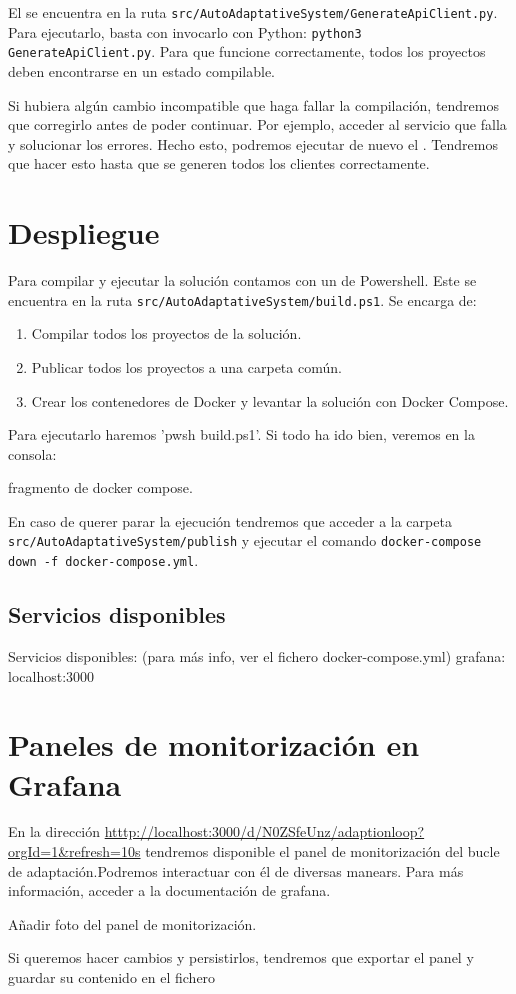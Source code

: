 El  se encuentra en la ruta \texttt{src/AutoAdaptativeSystem/GenerateApiClient.py}. Para ejecutarlo, basta con invocarlo con Python: \texttt{python3 GenerateApiClient.py}. Para que funcione correctamente, todos los proyectos deben encontrarse en un estado compilable.

Si hubiera algún cambio incompatible que haga fallar la compilación, tendremos que corregirlo antes de poder continuar. Por ejemplo, acceder al servicio que falla y solucionar los errores. Hecho esto, podremos ejecutar de nuevo el . Tendremos que hacer esto hasta que se generen todos los clientes correctamente.

\section{Despliegue}

Para compilar y ejecutar la solución contamos con un  de Powershell. Este se encuentra en la ruta \texttt{src/AutoAdaptativeSystem/build.ps1}. Se encarga de:
\begin{enumerate}
  \item Compilar todos los proyectos de la solución.
  \item Publicar todos los proyectos a una carpeta común.
  \item Crear los contenedores de Docker y levantar la solución con Docker Compose.
\end{enumerate}

Para ejecutarlo haremos 'pwsh build.ps1'. Si todo ha ido bien, veremos en la consola:

fragmento de docker compose.

En caso de querer parar la ejecución tendremos que acceder a la carpeta \texttt{src/AutoAdaptativeSystem/publish} y ejecutar el comando \texttt{docker-compose down -f docker-compose.yml}.


\subsection{Servicios disponibles}

Servicios disponibles: (para más info, ver el fichero docker-compose.yml)
grafana: localhost:3000

\section{Paneles de monitorización en Grafana}

En la dirección \url{htttp://localhost:3000/d/N0ZSfeUnz/adaptionloop?orgId=1&refresh=10s} tendremos disponible el panel de monitorización del bucle de adaptación.Podremos interactuar con él de diversas manears. Para más información, acceder a la documentación de grafana.

Añadir foto del panel de monitorización.

Si queremos hacer cambios y persistirlos, tendremos que exportar el panel y guardar su contenido en el fichero
